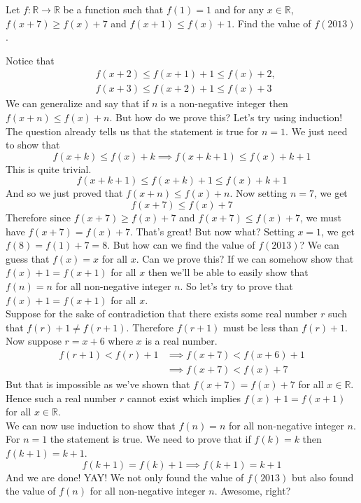 \documentclass[11pt,numbers=noenddot,svgnames,dvipsnames]{scrartcl}
\begin{document}
\begin{example}[BDMO]
    Let $f\colon \mathbb{R} \to \mathbb{R}$ be a function such that $f(1) = 1$ and for any $x\in \mathbb{R}$, 
    $f(x+7)\geq f(x) + 7$ and $f(x + 1)\leq f(x) + 1$. Find the value of $f(2013)$.
\end{example}
\begin{sol}
    Notice that 
    \begin{align*}
        & f(x + 2) \leq f(x + 1) + 1 \leq f(x) + 2, \\
        & f(x + 3) \leq f(x + 2) + 1 \leq f(x) + 3
    \end{align*}
    We can generalize and say that if $n$ is a non-negative integer then $f(x + n) \leq f(x) + n$. 
    But how do we prove this? Let's try using induction!\\
    The question already tells us that the statement is true for $n=1$. We just need to show 
    that 
    \[
        f(x + k)\leq f(x) + k \implies f(x + k + 1)\leq f(x) + k + 1
    \]
    This is quite trivial.
    \[
        f(x + k + 1 )\leq f(x + k) + 1 \leq f(x) + k + 1
    \]
    And so we just proved that $f(x+n) \leq f(x) + n$. Now setting $n=7$, we get 
    \[
        f(x + 7) \leq f(x) + 7
    \]
    Therefore since $f(x+7) \geq f(x)+7$ and $f(x+7) \leq f(x) + 7$, we must have $f(x + 7) = f(x) + 7$. 
    That's great! But now what? Setting $x=1$, we get $f(8) = f(1) + 7 = 8$. But how can we find the value of $f(2013)$? 
    We can guess that $f(x) = x$ for all $x$. Can we prove this? If we can somehow show that $f(x) + 1 = f(x+1)$ for all $x$ 
    then we'll be able to easily show that $f(n) = n$ for all non-negative integer $n$. So let's try to prove that 
    $f(x) + 1 = f(x + 1)$ for all $x$. \\
    Suppose for the sake of contradiction that there exists some real number $r$ 
    such that $f(r) + 1 \neq f(r + 1)$. Therefore $f(r+1)$ must be 
    less than $f(r) + 1$. Now suppose $r = x + 6$ where $x$ is a real number. 
    \begin{align*}
        f(r + 1) < f(r) + 1 & \implies f(x+7) < f(x + 6) + 1 \\
                            & \implies f(x+7) < f(x) + 7
    \end{align*}
    But that is impossible as we've shown that $f(x + 7) = f(x) + 7$  for all $x \in \mathbb{R}$. 
    Hence such a real number $r$ cannot exist which implies $f(x) + 1 = f(x + 1)$ for all $x \in \mathbb{R}$. \\
    We can now use induction to show that $f(n) = n$ for all non-negative integer $n$. For $n=1$ the statement 
    is true. We need to prove that if $f(k) = k$ then $f(k+1) = k + 1$.
    \[
        f(k + 1) = f(k) + 1 \implies f(k + 1) = k + 1
    \]
    And we are done! YAY! We not only found the value of $f(2013)$ but also found the value of $f(n)$ for all 
    non-negative integer $n$. Awesome, right?
\end{sol}
\end{document}
